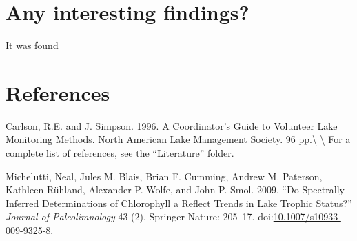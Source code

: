 \documentclass[]{article}
\begin{document}
\section{Any interesting findings?}\label{any-interesting-findings}

It was found

\section{References}\label{references}

Carlson, R.E. and J. Simpson. 1996. A Coordinator's Guide to Volunteer
Lake Monitoring Methods. North American Lake Management Society. 96
pp.\textbackslash{} \textbackslash{} For a complete list of references,
see the ``Literature'' folder.

\hypertarget{refs}{}
\hypertarget{ref-Michelutti_2009}{}
Michelutti, Neal, Jules M. Blais, Brian F. Cumming, Andrew M. Paterson,
Kathleen Rühland, Alexander P. Wolfe, and John P. Smol. 2009. ``Do
Spectrally Inferred Determinations of Chlorophyll a Reflect Trends in
Lake Trophic Status?'' \emph{Journal of Paleolimnology} 43 (2). Springer
Nature: 205--17.
doi:\href{https://doi.org/10.1007/s10933-009-9325-8}{10.1007/s10933-009-9325-8}.
\end{document}
